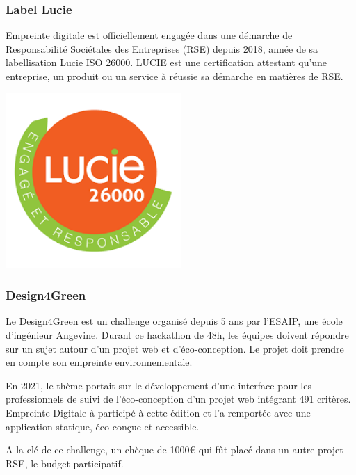 \documentclass[12pt, a4paper, twoside]{article}
\begin{document}
\subsubsection{Label Lucie}
\noindent%
\begin{minipage}{.7\textwidth}%
Empreinte digitale est officiellement engagée dans une démarche de Responsabilité Sociétales des Entreprises (\gls{RSE}) depuis 2018, année de sa labellisation Lucie \gls{ISO} 26000. 
LUCIE est une certification attestant qu'une entreprise, un produit ou un service à réussie sa démarche en matières de \gls{RSE}. \cite{Lucie}

\end{minipage}%
\hfill
\begin{minipage}{.3\textwidth}%
\begin{center}
\includegraphics[width=0.5\textwidth]{src/logo_lucie.png}
\end{center}
\end{minipage}%

\subsubsection{Design4Green}
Le Design4Green est un challenge organisé depuis 5 ans par l'ESAIP, une école d'ingénieur Angevine.
Durant ce hackathon de 48h, les équipes doivent répondre sur un sujet autour d'un projet web et d'éco-conception.
Le projet doit prendre en compte son empreinte environnementale.

En 2021, le thème portait sur le développement d'une interface pour les professionnels de suivi de l'éco-conception d'un projet web intégrant 491 critères.
Empreinte Digitale à participé à cette édition et l'a remportée avec une application statique, éco-conçue et accessible.

A la clé de ce challenge, un chèque de 1000€ qui fût placé dans un autre projet \gls{RSE}, le budget participatif.
\end{document}
